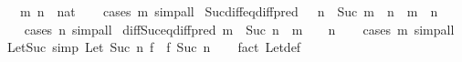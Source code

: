 \begin{isabellebody}
\ \ \ m\ n\ {\isacharcolon}{\kern0pt}{\isacharcolon}{\kern0pt}\ nat\isanewline
%
\isadelimproof
\ \ %
\endisadelimproof
%
\isatagproof
{}\isamarkupfalse%
\ {\isacharparenleft}{\kern0pt}cases\ m{\isacharparenright}{\kern0pt}\ simp{\isacharunderscore}{\kern0pt}all%
\endisatagproof
{\isafoldproof}%
%
\isadelimproof
\isanewline
%
\endisadelimproof
\isanewline
{}\isamarkupfalse%
\ Suc{\isacharunderscore}{\kern0pt}diff{\isacharunderscore}{\kern0pt}eq{\isacharunderscore}{\kern0pt}diff{\isacharunderscore}{\kern0pt}pred{\isacharcolon}{\kern0pt}\ {\isachardoublequoteopen}{}\ {\isacharless}{\kern0pt}\ n\ {\isasymLongrightarrow}\ Suc\ m\ {\isacharminus}{\kern0pt}\ n\ {\isacharequal}{\kern0pt}\ m\ {\isacharminus}{\kern0pt}\ {\isacharparenleft}{\kern0pt}n\ {\isacharminus}{\kern0pt}\ {}{\isacharparenright}{\kern0pt}{\isachardoublequoteclose}\isanewline
%
\isadelimproof
\ \ %
\endisadelimproof
%
\isatagproof
{}\isamarkupfalse%
\ {\isacharparenleft}{\kern0pt}cases\ n{\isacharparenright}{\kern0pt}\ simp{\isacharunderscore}{\kern0pt}all%
\endisatagproof
{\isafoldproof}%
%
\isadelimproof
\isanewline
%
\endisadelimproof
\isanewline
{}\isamarkupfalse%
\ diff{\isacharunderscore}{\kern0pt}Suc{\isacharunderscore}{\kern0pt}eq{\isacharunderscore}{\kern0pt}diff{\isacharunderscore}{\kern0pt}pred{\isacharcolon}{\kern0pt}\ {\isachardoublequoteopen}m\ {\isacharminus}{\kern0pt}\ Suc\ n\ {\isacharequal}{\kern0pt}\ {\isacharparenleft}{\kern0pt}m\ {\isacharminus}{\kern0pt}\ {}{\isacharparenright}{\kern0pt}\ {\isacharminus}{\kern0pt}\ n{\isachardoublequoteclose}\isanewline
%
\isadelimproof
\ \ %
\endisadelimproof
%
\isatagproof
{}\isamarkupfalse%
\ {\isacharparenleft}{\kern0pt}cases\ m{\isacharparenright}{\kern0pt}\ simp{\isacharunderscore}{\kern0pt}all%
\endisatagproof
{\isafoldproof}%
%
\isadelimproof
\isanewline
%
\endisadelimproof
\isanewline
{}\isamarkupfalse%
\ Let{\isacharunderscore}{\kern0pt}Suc\ {\isacharbrackleft}{\kern0pt}simp{\isacharbrackright}{\kern0pt}{\isacharcolon}{\kern0pt}\ {\isachardoublequoteopen}Let\ {\isacharparenleft}{\kern0pt}Suc\ n{\isacharparenright}{\kern0pt}\ f\ {\isasymequiv}\ f\ {\isacharparenleft}{\kern0pt}Suc\ n{\isacharparenright}{\kern0pt}{\isachardoublequoteclose}\isanewline
%
\isadelimproof
\ \ %
\endisadelimproof
%
\isatagproof
{}\isamarkupfalse%
\ {\isacharparenleft}{\kern0pt}fact\ Let{\isacharunderscore}{\kern0pt}def{\isacharparenright}{\kern0pt}%
\endisatagproof
{\isafoldproof}%
%
\isadelimproof
%
\endisadelimproof

\end{isabellebody}
